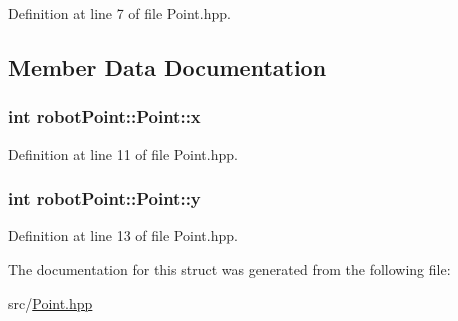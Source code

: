 Definition at line 7 of file Point.\+hpp.



\subsection{Member Data Documentation}
\subsubsection[{\texorpdfstring{x}{x}}]{\setlength{\rightskip}{0pt plus 5cm}int robot\+Point\+::\+Point\+::x}\hypertarget{structrobot_point_1_1_point_a5ac498e2ee54c0392e83c669e1189ee4}{}\label{structrobot_point_1_1_point_a5ac498e2ee54c0392e83c669e1189ee4}


Definition at line 11 of file Point.\+hpp.

\subsubsection[{\texorpdfstring{y}{y}}]{\setlength{\rightskip}{0pt plus 5cm}int robot\+Point\+::\+Point\+::y}\hypertarget{structrobot_point_1_1_point_a402c118e3769d8cdf72e209f9cab3546}{}\label{structrobot_point_1_1_point_a402c118e3769d8cdf72e209f9cab3546}


Definition at line 13 of file Point.\+hpp.



The documentation for this struct was generated from the following file\+:\begin{DoxyCompactItemize}
\item 
src/\hyperlink{_point_8hpp}{Point.\+hpp}\end{DoxyCompactItemize}
